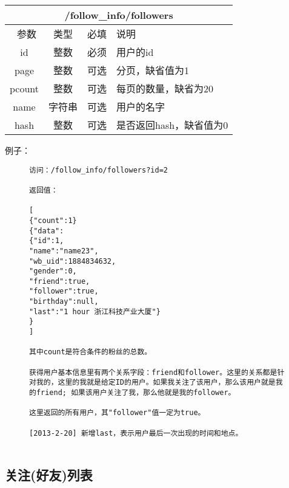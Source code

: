 \documentclass[cs4size]{ctexartutf8}
\begin{document}
\begin{table}[H]
   \begin{center}
\begin{tabular}{|c|c|c|p{12cm}|}
\hline
\multicolumn{4}{|c|}{/follow\_info/followers} \\
\hline\hline
 \  参数  & 类型 & 必填 &  说明  \\
\hline
 id  & 整数 & 必须 & 用户的id\\
   \hline
 page  & 整数 & 可选 & 分页，缺省值为1\\ 
 \hline
 pcount  & 整数 & 可选 & 每页的数量，缺省为20\\ 
    \hline
 name  & 字符串 & 可选 & 用户的名字\\ 
    \hline    
 hash  & 整数 & 可选 & 是否返回hash，缺省值为0\\ 
\hline

\end{tabular}
   \end{center}
\end{table}

例子：

\begin{figure}[H]
\begin{verbatim}
访问：/follow_info/followers?id=2

返回值：

[
{"count":1}
{"data":
{"id":1,
"name":"name23",
"wb_uid":1884834632,
"gender":0,
"friend":true,
"follower":true,
"birthday":null,
"last":"1 hour 浙江科技产业大厦"}
}
]

其中count是符合条件的粉丝的总数。

获得用户基本信息里有两个关系字段：friend和follower。这里的关系都是针对我的，这里的我就是给定ID的用户。如果我关注了该用户，那么该用户就是我的friend; 如果该用户关注了我，那么他就是我的follower。

这里返回的所有用户，其"follower"值一定为true。

[2013-2-20] 新增last，表示用户最后一次出现的时间和地点。


\end{verbatim}
\end{figure}


\subsection{关注(好友)列表}
\end{document}
